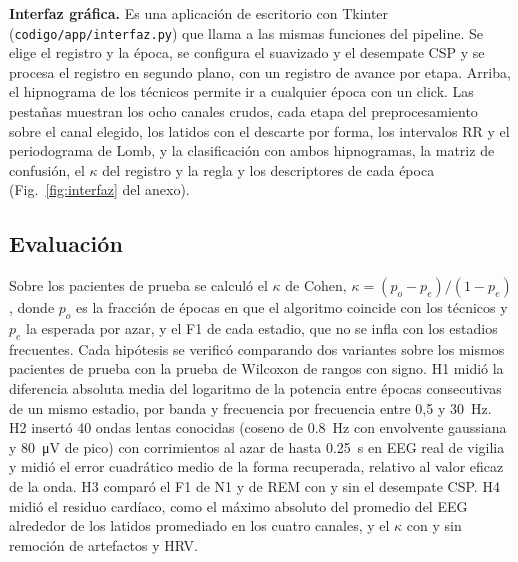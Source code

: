 \textbf{Interfaz gráfica.} Es una aplicación de escritorio con Tkinter (\texttt{codigo/app/interfaz.py}) que llama a las mismas funciones del pipeline. Se elige el registro y la época, se configura el suavizado y el desempate CSP y se procesa el registro en segundo plano, con un registro de avance por etapa. Arriba, el hipnograma de los técnicos permite ir a cualquier época con un click. Las pestañas muestran los ocho canales crudos, cada etapa del preprocesamiento sobre el canal elegido, los latidos con el descarte por forma, los intervalos RR y el periodograma de Lomb, y la clasificación con ambos hipnogramas, la matriz de confusión, el $\kappa$ del registro y la regla y los descriptores de cada época (Fig.~\ref{fig:interfaz} del anexo).

\subsection{Evaluación}
Sobre los pacientes de prueba se calculó el $\kappa$ de Cohen, $\kappa = (p_o - p_e)/(1 - p_e)$, donde $p_o$ es la fracción de épocas en que el algoritmo coincide con los técnicos y $p_e$ la esperada por azar, y el F1 de cada estadio, que no se infla con los estadios frecuentes. Cada hipótesis se verificó comparando dos variantes sobre los mismos pacientes de prueba con la prueba de Wilcoxon de rangos con signo. H1 midió la diferencia absoluta media del logaritmo de la potencia entre épocas consecutivas de un mismo estadio, por banda y frecuencia por frecuencia entre 0,5 y \SI{30}{\hertz}. H2 insertó 40 ondas lentas conocidas (coseno de \SI{0,8}{\hertz} con envolvente gaussiana y \SI{80}{\micro\volt} de pico) con corrimientos al azar de hasta \SI{0,25}{\second} en EEG real de vigilia y midió el error cuadrático medio de la forma recuperada, relativo al valor eficaz de la onda. H3 comparó el F1 de N1 y de REM con y sin el desempate CSP. H4 midió el residuo cardíaco, como el máximo absoluto del promedio del EEG alrededor de los latidos promediado en los cuatro canales, y el $\kappa$ con y sin remoción de artefactos y HRV.
